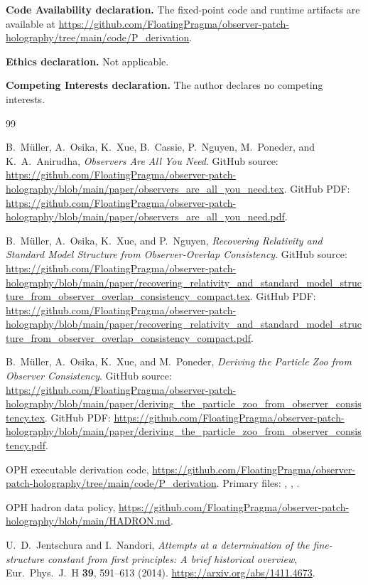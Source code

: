 \documentclass[11pt]{article}
\theoremstyle{remark}
\begin{document}
\textbf{Code Availability declaration.} The fixed-point code and runtime artifacts are available at
\url{https://github.com/FloatingPragma/observer-patch-holography/tree/main/code/P_derivation}.

\textbf{Ethics declaration.} Not applicable.

\textbf{Competing Interests declaration.} The author declares no competing interests.

\begin{thebibliography}{99}

B.\ M\"uller, A.\ Osika, K.\ Xue, B.\ Cassie, P.\ Nguyen, M.\ Poneder, and K.\ A.\ Anirudha,
\emph{Observers Are All You Need}.
GitHub source:
\url{https://github.com/FloatingPragma/observer-patch-holography/blob/main/paper/observers_are_all_you_need.tex}.
GitHub PDF:
\url{https://github.com/FloatingPragma/observer-patch-holography/blob/main/paper/observers_are_all_you_need.pdf}.

B.\ M\"uller, A.\ Osika, K.\ Xue, and P.\ Nguyen,
\emph{Recovering Relativity and Standard Model Structure from Observer-Overlap Consistency}.
GitHub source:
\url{https://github.com/FloatingPragma/observer-patch-holography/blob/main/paper/recovering_relativity_and_standard_model_structure_from_observer_overlap_consistency_compact.tex}.
GitHub PDF:
\url{https://github.com/FloatingPragma/observer-patch-holography/blob/main/paper/recovering_relativity_and_standard_model_structure_from_observer_overlap_consistency_compact.pdf}.

B.\ M\"uller, A.\ Osika, K.\ Xue, and M.\ Poneder,
\emph{Deriving the Particle Zoo from Observer Consistency}.
GitHub source:
\url{https://github.com/FloatingPragma/observer-patch-holography/blob/main/paper/deriving_the_particle_zoo_from_observer_consistency.tex}.
GitHub PDF:
\url{https://github.com/FloatingPragma/observer-patch-holography/blob/main/paper/deriving_the_particle_zoo_from_observer_consistency.pdf}.

OPH executable derivation code,
\url{https://github.com/FloatingPragma/observer-patch-holography/tree/main/code/P_derivation}.
Primary files:
,
,
.

OPH hadron data policy,
\url{https://github.com/FloatingPragma/observer-patch-holography/blob/main/HADRON.md}.

U.\ D.\ Jentschura and I.\ Nandori,
\emph{Attempts at a determination of the fine-structure constant from first principles: A brief historical overview},
Eur.\ Phys.\ J.\ H \textbf{39}, 591--613 (2014).
\url{https://arxiv.org/abs/1411.4673}.


\end{thebibliography}
\end{document}
